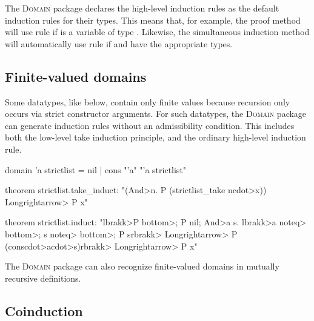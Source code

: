 The \textsc{Domain} package declares the high-level induction rules as the default induction rules for their types. This means that, for example, the proof method  will use rule  if  is a variable of type . Likewise, the simultaneous induction method  will automatically use rule  if  and  have the appropriate types.

\subsection{Finite-valued domains}

Some datatypes, like  below, contain only finite values because recursion only occurs via strict constructor arguments. For such datatypes, the \textsc{Domain} package can generate induction rules without an admissibility condition. This includes both the low-level take induction principle, and the ordinary high-level induction rule.
%
\begin{isacode}
domain 'a strictlist = nil | cons "'a" "'a strictlist"
\end{isacode}
\unmedskip
{}
\begin{isacode}
theorem strictlist.take_induct: "(\<And>n. P (strictlist_take n\<cdot>x)) \<Longrightarrow> P x"
\end{isacode}
\unmedskip
{}
\begin{isacode}
theorem strictlist.induct:
  "\<lbrakk>P \<bottom>; P nil; \<And>a s. \<lbrakk>a \<noteq> \<bottom>; s \<noteq> \<bottom>; P s\<rbrakk> \<Longrightarrow> P (cons\<cdot>a\<cdot>s)\<rbrakk> \<Longrightarrow> P x"
\end{isacode}
%
The \textsc{Domain} package can also recognize finite-valued domains in mutually recursive definitions.

\subsection{Coinduction}

